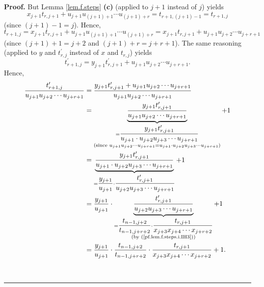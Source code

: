 \documentclass[numbers=enddot,12pt,final,onecolumn,notitlepage]{scrartcl}%
\theoremstyle{definition}
\newenvironment{proof}[1][Proof]{\noindent\textbf{#1.} }{\ \rule{0.5em}{0.5em}}
\newenvironment{verlong}{}{}
\begin{document}
\begin{proof}
\begin{verlong}
But Lemma \ref{lem.f.steps} \textbf{(c)} (applied to $j+1$ instead of $j$)
yields%
\[
x_{j+1}t_{r,j+1}+u_{j+1}u_{\left(  j+1\right)  +1}\cdots u_{\left(
j+1\right)  +r}=t_{r+1,\left(  j+1\right)  -1}=t_{r+1,j}%
\]
(since $\left(  j+1\right)  -1=j$). Hence,%
\[
t_{r+1,j}=x_{j+1}t_{r,j+1}+u_{j+1}u_{\left(  j+1\right)  +1}\cdots u_{\left(
j+1\right)  +r}=x_{j+1}t_{r,j+1}+u_{j+1}u_{j+2}\cdots u_{j+r+1}%
\]
(since $\left(  j+1\right)  +1=j+2$ and $\left(  j+1\right)  +r=j+r+1$). The
same reasoning (applied to $y$ and $t_{r,j}^{\prime}$ instead of $x$ and
$t_{r,j}$) yields
\[
t_{r+1,j}^{\prime}=y_{j+1}t_{r,j+1}^{\prime}+u_{j+1}u_{j+2}\cdots u_{j+r+1}.
\]
Hence,%
\begin{align}
\dfrac{t_{r+1,j}^{\prime}}{u_{j+1}u_{j+2}\cdots u_{j+r+1}}  &  =\dfrac
{y_{j+1}t_{r,j+1}^{\prime}+u_{j+1}u_{j+2}\cdots u_{j+r+1}}{u_{j+1}%
u_{j+2}\cdots u_{j+r+1}}\nonumber\\
&  =\underbrace{\dfrac{y_{j+1}t_{r,j+1}^{\prime}}{u_{j+1}u_{j+2}\cdots
u_{j+r+1}}}_{\substack{=\dfrac{y_{j+1}t_{r,j+1}^{\prime}}{u_{j+1}\cdot
u_{j+2}u_{j+3}\cdots u_{j+r+1}}\\\text{(since }u_{j+1}u_{j+2}\cdots
u_{j+r+1}=u_{j+1}\cdot u_{j+2}u_{j+3}\cdots u_{j+r+1}\text{)}}}+1\nonumber\\
&  =\underbrace{\dfrac{y_{j+1}t_{r,j+1}^{\prime}}{u_{j+1}\cdot u_{j+2}%
u_{j+3}\cdots u_{j+r+1}}}_{=\dfrac{y_{j+1}}{u_{j+1}}\cdot\dfrac{t_{r,j+1}%
^{\prime}}{u_{j+2}u_{j+3}\cdots u_{j+r+1}}}+1\nonumber\\
&  =\dfrac{y_{j+1}}{u_{j+1}}\cdot\underbrace{\dfrac{t_{r,j+1}^{\prime}%
}{u_{j+2}u_{j+3}\cdots u_{j+r+1}}}_{\substack{=\dfrac{t_{n-1,j+2}%
}{t_{n-1,j+r+2}}\cdot\dfrac{t_{r,j+1}}{x_{j+3}x_{j+4}\cdots x_{j+r+2}%
}\\\text{(by (\ref{pf.lem.f.steps.i.IH3}))}}}+1\nonumber\\
&  =\dfrac{y_{j+1}}{u_{j+1}}\cdot\dfrac{t_{n-1,j+2}}{t_{n-1,j+r+2}}\cdot
\dfrac{t_{r,j+1}}{x_{j+3}x_{j+4}\cdots x_{j+r+2}}+1.
\label{pf.lem.f.steps.i.3}%
\end{align}



\end{verlong}
\end{proof}
\end{document}
